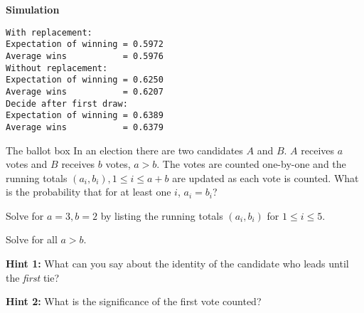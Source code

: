 \textbf{Simulation}
\begin{verbatim}
With replacement:
Expectation of winning = 0.5972
Average wins           = 0.5976
Without replacement:
Expectation of winning = 0.6250
Average wins           = 0.6207
Decide after first draw:
Expectation of winning = 0.6389
Average wins           = 0.6379
\end{verbatim}




\begin{prob}{The ballot box}
In an election there are two candidates $A$ and $B$.  $A$ receives $a$ votes and $B$ receives $b$ votes, $a>b$. The votes are counted one-by-one and the running totals $(a_i,b_i), 1\leq i \leq a+b$ are updated as each vote is counted. What is the probability that for at least one $i$, $a_i=b_i$?

 Solve for $a=3, b=2$ by listing the running totals $(a_i,b_i)$ for $1\leq i\leq 5$.

 Solve for all $a>b$.

\textbf{Hint 1:} What can you say about the identity of the candidate who leads until the \emph{first} tie?

\textbf{Hint 2:} What is the significance of the first vote counted?
\end{prob}

\newpage

\solution{}

